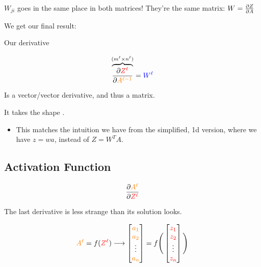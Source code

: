         $W_{ji}$ goes in the same place in both matrices! They're the same matrix: $W=\frac{\partial Z}{\partial A}$
            
        We get our final result:\\
        
        
        \begin{notation}
            Our derivative
            
            \begin{equation*}
                \overbrace{
                    \frac{\partial \textcolor{red}{Z^\ell}}{\partial \textcolor{orange}{A^{\ell-1}}}
                }^{ (m^{\ell} \times n^{\ell}) }
                =
                \textcolor{blue}{W^\ell}
            \end{equation*}
        
            Is a vector/vector derivative, and thus a matrix.
            
            It takes the shape .

            \subsecdiv

            \begin{itemize}
                \item This matches the intuition we have from the simplified, 1d version, where we have $z=wa$, instead of $Z = W^TA$.
            \end{itemize}
        \end{notation}
            
           
    \secdiv  
         
    \subsection{Activation Function}
        
        \begin{equation}
            \frac{\partial \textcolor{orange}{A^\ell}}{\partial \textcolor{red}{Z^\ell}}
        \end{equation}
    
        The last derivative is less strange than its solution looks.
        
        \begin{equation}
            \textcolor{orange}{A^\ell} = f( \textcolor{red}{Z^\ell} ) 
            \longrightarrow
            \begin{bmatrix}
                \textcolor{orange}{a_1}\\ \textcolor{orange}{a_2}\\ \vdots \\ \textcolor{orange}{a_n}
            \end{bmatrix}
            =
            f
            \Bigg(
            \begin{bmatrix}
                \textcolor{red}{z_1}\\\textcolor{red}{z_2}\\ \vdots \\ \textcolor{red}{z_n}
            \end{bmatrix}
            \Bigg)
        \end{equation}
        
